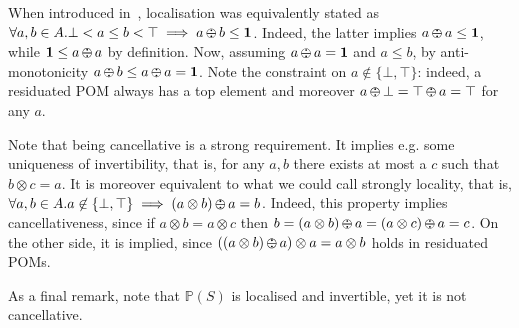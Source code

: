 \documentclass{llncs}
\def\1{{\mathbf 1}}
\def\1{{\mathbf 1}}
\def\odiv{\, {\ominus\hspace{-7.7pt} \div} \,}
\begin{document}
\begin{remark}
When introduced in~\cite[Def.~2.4]{ipl17}, localisation was equivalently stated as 
$\forall a, b \in A. \bot < a \leq b<\top \implies a \odiv b \leq \1$.
Indeed, the latter implies $a \odiv a \leq \1$, while  $\1 \leq a \odiv a$
by definition. Now, assuming $a \odiv a = \1$ and $a \leq b$, 
by anti-monotonicity $a \odiv b \leq a \odiv a = \1$.
Note the constraint on $a \not \in \{\bot,\top\}$: indeed, a residuated POM 
always has a top element and moreover 
$a \odiv \bot = \top \odiv a = \top$ for any  $a$.

Note that being cancellative is a strong requirement. It implies e.g. 
some uniqueness of invertibility, that is, for any $a, b$ there exists 
at most a $c$ such that $b\otimes c = a$.
It is moreover equivalent to what we could call strongly locality,
that is, $\forall a, b \in A. a \not \in \{\bot,\top\} \implies (a \otimes b) \odiv a = b$. 
Indeed, this property implies cancellativeness, since if $a \otimes b = a \otimes c$ 
then $b = (a \otimes b) \odiv a = (a \otimes c) \odiv a = c$. On the other side,
it is implied, since 
$((a \otimes b) \odiv a)\otimes a = a \otimes b$ holds in residuated POMs.

As a final remark, note that $\mathbb{P}(S)$ is localised and invertible, yet it is not cancellative.
\end{remark}
\end{document}
